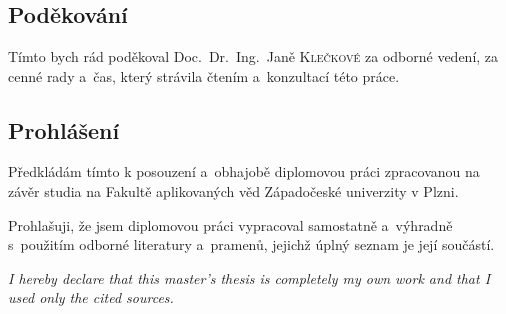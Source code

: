 \chapter*{}

\section*{Poděkování}\label{sec:poděkování}

Tímto bych rád poděkoval Doc.\ Dr.\ Ing.\ Janě \textsc{Klečkové} za odborné vedení, za cenné rady a~čas, který strávila čtením a~konzultací této práce.

\vspace{5cm}

\section*{Prohlášení}

Předkládám tímto k posouzení a~obhajobě diplomovou práci zpracovanou na závěr studia na Fakultě aplikovaných věd Západočeské univerzity v Plzni.\newline

Prohlašuji, že jsem diplomovou práci vypracoval samostatně a~výhradně s~použitím odborné literatury a~pramenů, jejichž úplný seznam je její součástí.

\textit{I hereby declare that this master's thesis is completely my own work and that I used only the cited sources.}

\vspace{3.5cm}

\noindent{}
